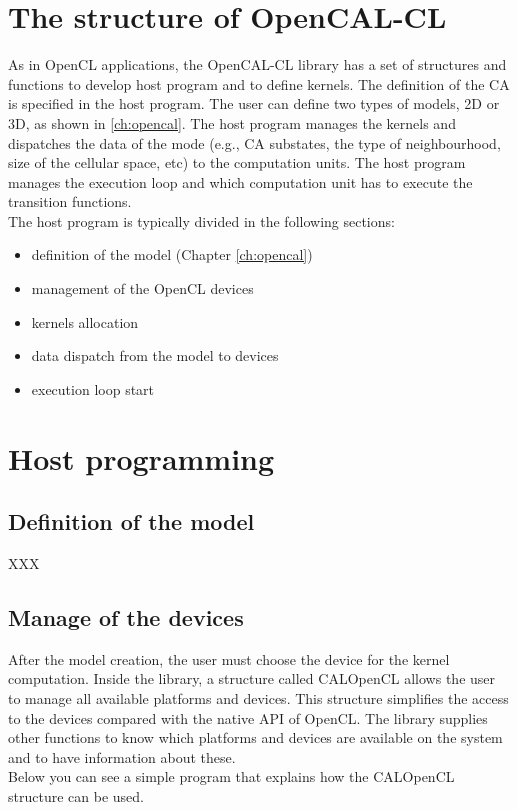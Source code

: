 \section{The structure of OpenCAL-CL}
As in OpenCL applications, the OpenCAL-CL library has a set of
structures and functions to develop host program and to define
kernels. The definition of the CA is specified in the host
program. The user can define two types of models, 2D or 3D, as shown
in \ref{ch:opencal}.  The host program manages the kernels and
dispatches the data of the mode (e.g., CA substates, the type of
neighbourhood, size of the cellular space, etc) to the computation
units.  The host program manages the execution loop and which
computation unit has to execute the transition functions. \\ The host
program is typically divided in the following sections:
\begin{itemize}
\item definition of the model (Chapter \ref{ch:opencal})
\item management of the OpenCL devices
\item kernels allocation
\item data dispatch from the model to devices
\item execution loop start
\end{itemize}

\section{Host programming} 

\subsection{Definition of the model}

XXX

\subsection{Manage of the devices}

After the model creation, the user must choose the device for the
kernel computation.  Inside the library, a structure called CALOpenCL
allows the user to manage all available platforms and devices.  This
structure simplifies the access to the devices compared with the
native API of OpenCL. The library supplies other functions to know
which platforms and devices are available on the system and to have
information about these.\\ Below you can see a simple program that
explains how the CALOpenCL structure can be used.


